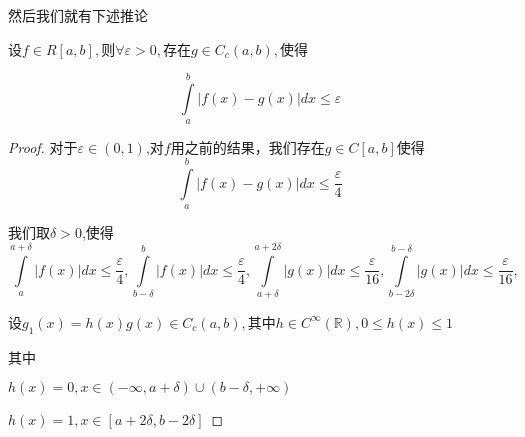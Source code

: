 \documentclass[lang=cn,10pt]{elegantbook}
\begin{document}
	然后我们就有下述推论
	\begin{corollary}
		设$f\in R\left[ a,b \right] ,\text{则}\forall \varepsilon >0,\text{存在}g\in C_{c}(a,b) ,\text{使得}$
		
		\begin{equation*}
			\int\limits_a^b{|f\left( x \right) -g\left( x \right) |dx}\le \varepsilon
		\end{equation*}
	\end{corollary}
	\begin{proof}
		
		对于$\varepsilon \in (0,1)$,对$f$用之前的结果，我们存在$g \in C[a,b]$使得
		\begin{equation*}
			\int\limits_a^b{|f\left( x \right) -g\left( x \right) |dx}\le \frac{\varepsilon}{4}
		\end{equation*}
		
		我们取$\delta >0$,使得
		\begin{equation*}
			\int\limits_a^{a+\delta}{|f\left( x \right) |dx}\le \frac{\varepsilon}{4},\int\limits_{b-\delta}^b{|f\left( x \right) |dx}\le \frac{\varepsilon}{4},\int\limits_{a+\delta}^{a+2\delta}{|g\left( x \right) |dx}\le \frac{\varepsilon}{16},\int\limits_{b-2\delta}^{b-\delta}{|g\left( x \right) |dx}\le \frac{\varepsilon}{16},
		\end{equation*}
		
		设$g_1\left( x \right) =h\left( x \right) g\left( x \right) \in C_c\left( a,b \right) ,\text{其中}h\in C^{\infty}\left( \mathbb{R} \right) ,0\le h\left( x \right) \le 1
		$
		
		其中
		
		$h(x)=0,x\in (-\infty,a+\delta)\cup (b-\delta,+\infty)$
		
		$h(x)=1,x\in [a+2\delta,b-2\delta]$
		

\end{proof}
\end{document}

